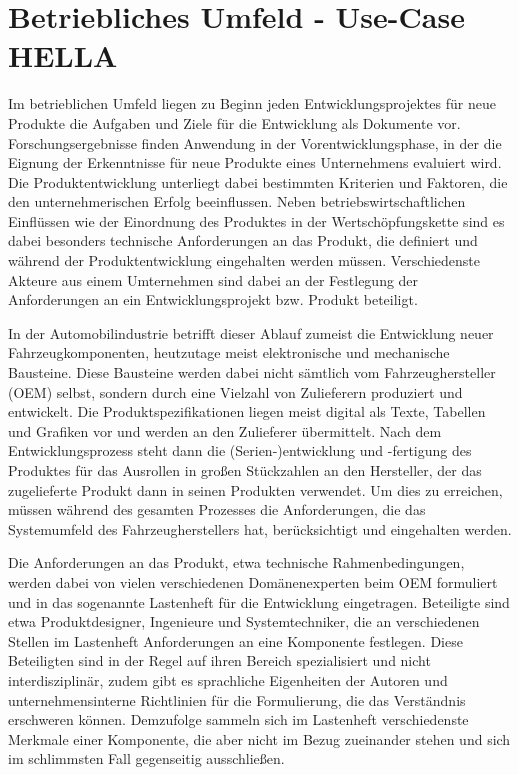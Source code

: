 \documentclass[12pt]{report}
\begin{document}
\chapter{Betriebliches Umfeld - Use-Case HELLA}
Im betrieblichen Umfeld liegen zu Beginn jeden Entwicklungsprojektes für neue Produkte die Aufgaben und Ziele für die Entwicklung als Dokumente vor. Forschungsergebnisse finden Anwendung in der Vorentwicklungsphase, in der die Eignung der Erkenntnisse für neue Produkte eines Unternehmens evaluiert wird. Die Produktentwicklung unterliegt dabei bestimmten Kriterien und Faktoren, die den unternehmerischen Erfolg beeinflussen. Neben betriebswirtschaftlichen Einflüssen wie der Einordnung des Produktes in der Wertschöpfungskette sind es dabei besonders technische Anforderungen an das Produkt, die definiert und während der Produktentwicklung eingehalten werden müssen. Verschiedenste Akteure aus einem Umternehmen sind dabei an der Festlegung der Anforderungen an ein Entwicklungsprojekt bzw. Produkt beteiligt. 

In der Automobilindustrie betrifft dieser Ablauf zumeist die Entwicklung neuer Fahrzeugkomponenten, heutzutage meist elektronische und mechanische Bausteine. Diese Bausteine werden dabei nicht sämtlich vom Fahrzeughersteller (OEM) selbst, sondern durch eine Vielzahl von Zulieferern produziert und entwickelt. Die Produktspezifikationen liegen meist digital als Texte, Tabellen und Grafiken vor und werden an den Zulieferer übermittelt.
Nach dem Entwicklungsprozess steht dann die (Serien-)entwicklung und -fertigung des Produktes für das Ausrollen in großen Stückzahlen an den Hersteller, der das zugelieferte Produkt dann in seinen Produkten verwendet. Um dies zu erreichen, müssen während des gesamten Prozesses die Anforderungen, die das Systemumfeld des  Fahrzeugherstellers hat, berücksichtigt und eingehalten werden.

Die Anforderungen an das Produkt, etwa technische Rahmenbedingungen, werden dabei von vielen verschiedenen Domänenexperten beim OEM formuliert und in das sogenannte Lastenheft für die Entwicklung eingetragen. Beteiligte sind etwa Produktdesigner, Ingenieure und Systemtechniker, die an verschiedenen Stellen im Lastenheft Anforderungen an eine Komponente festlegen. Diese Beteiligten sind in der Regel auf ihren Bereich spezialisiert und nicht interdisziplinär, zudem gibt es sprachliche Eigenheiten der Autoren und unternehmensinterne Richtlinien für die Formulierung, die das Verständnis erschweren können. Demzufolge sammeln sich im Lastenheft verschiedenste Merkmale einer Komponente, die aber nicht im Bezug zueinander stehen und sich im schlimmsten Fall gegenseitig ausschließen. 
\end{document}
